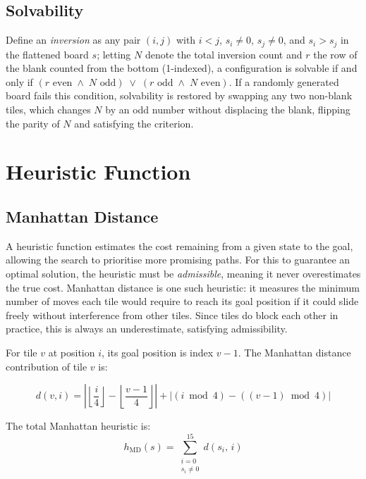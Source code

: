 \documentclass[11pt]{article}
\begin{document}
	\subsection{Solvability}
	
	Define an \textit{inversion} as any pair $(i, j)$ with $i < j$, $s_i \neq 0$, 
	$s_j \neq 0$, and $s_i > s_j$ in the flattened board $s$; letting $N$ denote 
	the total inversion count and $r$ the row of the blank counted from the bottom 
	(1-indexed), a configuration is solvable if and only if 
	$(r \text{ even} \;\wedge\; N \text{ odd}) \;\vee\; (r \text{ odd} \;\wedge\; N \text{ even})$. 
	If a randomly generated board fails this condition, solvability is restored by 
	swapping any two non-blank tiles, which changes $N$ by an odd number without 
	displacing the blank, flipping the parity of $N$ and satisfying the criterion.
	
	\section{Heuristic Function}
	
	\subsection{Manhattan Distance}
	
	A heuristic function estimates the cost remaining from a given state to the 
	goal, allowing the search to prioritise more promising paths. For this to 
	guarantee an optimal solution, the heuristic must be \textit{admissible}, 
	meaning it never overestimates the true cost. Manhattan distance is one such 
	heuristic: it measures the minimum number of moves each tile would require to 
	reach its goal position if it could slide freely without interference from 
	other tiles. Since tiles do block each other in practice, this is always an 
	underestimate, satisfying admissibility.
	
	For tile $v$ at position $i$, its goal position is index $v - 1$. The 
	Manhattan distance contribution of tile $v$ is:
	
	\[
	d(v, i) = \left|\left\lfloor\frac{i}{4}\right\rfloor - \left\lfloor\frac{v-1}{4}\right\rfloor\right|
	+ \left|(i \bmod 4) - ((v-1) \bmod 4)\right|
	\]
	
	The total Manhattan heuristic is:
	\[
	h_{\text{MD}}(s) = \sum_{\substack{i=0 \\ s_i \neq 0}}^{15} d(s_i,\, i)
	\]
	
\end{document}
